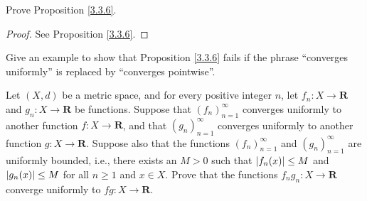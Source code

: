 \begin{exercise}\label{ex 3.3.6}
    Prove Proposition \ref{3.3.6}.
\end{exercise}

\begin{proof}
    See Proposition \ref{3.3.6}.
\end{proof}

\begin{exercise}\label{ex 3.3.7}
    Give an example to show that Proposition \ref{3.3.6} fails if the phrase ``converges uniformly'' is replaced by ``converges pointwise''.
\end{exercise}

\begin{exercise}\label{ex 3.3.8}
    Let \((X, d)\) be a metric space, and for every positive integer \(n\), let \(f_n : X \to \mathbf{R}\) and \(g_n : X \to \mathbf{R}\) be functions.
    Suppose that \((f_n)_{n = 1}^\infty\) converges uniformly to another function \(f : X \to \mathbf{R}\), and that \((g_n)_{n = 1}^\infty\) converges uniformly to another function \(g : X \to \mathbf{R}\).
    Suppose also that the functions \((f_n)_{n = 1}^\infty\) and \((g_n)_{n = 1}^\infty\) are uniformly bounded, i.e., there exists an \(M > 0\) such that \(\abs*{f_n(x)} \leq M\) and \(\abs*{g_n(x)} \leq M\) for all \(n \geq 1\) and \(x \in X\).
    Prove that the functions \(f_n g_n : X \to \mathbf{R}\) converge uniformly to \(fg : X \to \mathbf{R}\).
\end{exercise}